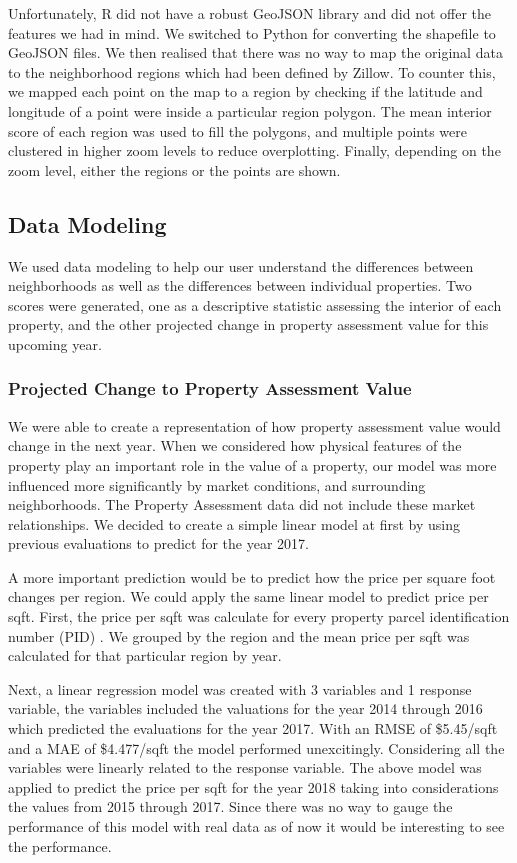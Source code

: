 \documentclass[12pt]{article}
\begin{document}
Unfortunately, R did not have a robust GeoJSON library and did not 
offer the features we had in mind. We switched to Python for converting
the shapefile to GeoJSON files. We then realised that there was no way to
map the original data to the neighborhood regions which had been defined
by Zillow. To counter this, we mapped each point on the map to a region
by checking if the latitude and longitude of a point were inside a
particular region polygon. The mean interior score
of each region was used to fill the polygons, and multiple points were
clustered in higher zoom levels to reduce overplotting. Finally,
depending on the zoom level, either the regions or the points are shown.


\subsection{Data Modeling}

We used data modeling to help our user understand the differences between
neighborhoods as well as the differences between individual properties.
Two scores were generated, one as a descriptive statistic assessing the
interior of each property, and the other projected change in property
assessment value for this upcoming year. 

\subsubsection{Projected Change to Property Assessment Value}

We were able to create a representation of how property assessment
value would change in the next year. When we considered how physical
features of the property play an important role in the value of a
property, our model was more influenced more significantly by market
conditions, and surrounding neighborhoods. The Property Assessment data
did not include these market relationships. We decided to create a
simple linear model at first by using previous evaluations to predict for
the year 2017.

A more important prediction would be to predict how the price per square 
foot changes per region. We could apply the same linear model to predict 
price per sqft. First, the price per sqft was calculate for every
property parcel identification number (PID) \cite{Property49:online}. We
grouped by the region and the mean price per sqft was calculated for that
particular region by year.

Next, a linear regression model was created with 3 variables and 1 
response variable, the variables included the valuations for the year 
2014 through 2016 which predicted the evaluations for the year 2017. With 
an RMSE of \$5.45/sqft and a MAE of \$4.477/sqft the model performed 
unexcitingly. Considering all the variables were linearly related to the 
response variable. The above model was applied to predict the price per
sqft for the year 2018 taking into considerations the values from 2015
through 2017. Since there was no way to gauge the performance of this
model with real data as of now it would be interesting to see the
performance.
\end{document}
